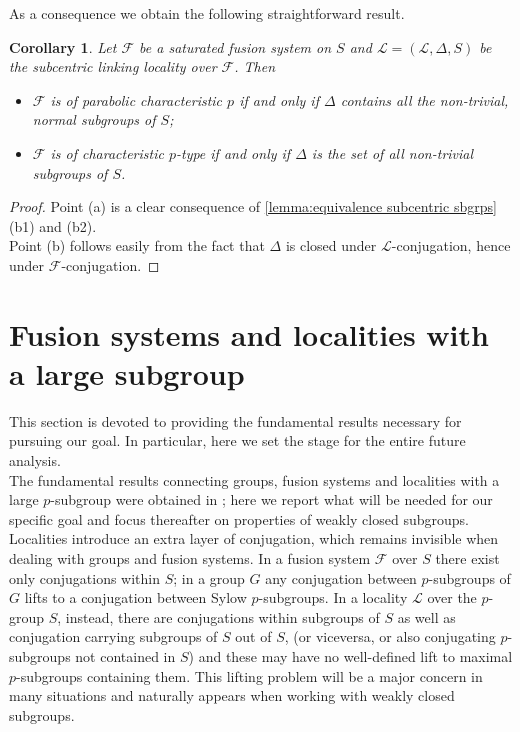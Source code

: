 \documentclass{amsart}
\numberwithin{equation}{section}
\newtheorem{cor}[equation]{Corollary}
\theoremstyle{definition}
\theoremstyle{subresult}
\theoremstyle{caseresult}
\newcommand{\F}{\mathcal{F}}
\renewcommand{\L}{\mathcal{L}}
\newcommand{\<}{\langle}
\renewcommand{\>}{\rangle}
\begin{document}
As a consequence we obtain the following straightforward result.

\begin{cor}
	\label{cor:locality transl of char p type}
    Let $\F$ be a saturated fusion system on $S$ and $\L=(\L,\Delta,S)$ be the subcentric linking locality over $\F$. Then
    \begin{itemize}
        \item[(a)] $\F$ is of parabolic characteristic $p$ if and only if $\Delta$ contains all the non-trivial, normal subgroups of $S$;
        \item[(b)] $\F$ is of characteristic $p$-type if and only if $\Delta$ is the set of all non-trivial subgroups of $S$.
    \end{itemize}
\end{cor}
\begin{proof}
    Point (a) is a clear consequence of \ref{lemma:equivalence subcentric sbgrps}(b1) and (b2).\\
    Point (b) follows easily from the fact that $\Delta$ is closed under $\L$-conjugation, hence under $\F$-conjugation.
\end{proof}



\section{Fusion systems and localities with a large subgroup}
\label{large subgroups}
This section is devoted to providing the fundamental results necessary for pursuing our goal. In particular, here we set the stage for the entire future analysis.\\
The fundamental results connecting groups, fusion systems and localities with a large $p$-subgroup were obtained in \cite[Section 4]{Henke-Salati:2026}; here we report what will be needed for our specific goal and focus thereafter on properties of weakly closed subgroups. Localities introduce an extra layer of conjugation, which remains invisible when dealing with groups and fusion systems. In a fusion system $\F$ over $S$ there exist only conjugations within $S$; in a group $G$ any conjugation between $p$-subgroups of $G$ lifts to a conjugation between Sylow $p$-subgroups. In a locality $\L$ over the $p$-group $S$, instead, there are conjugations within subgroups of $S$ as well as conjugation carrying subgroups of $S$ out of $S$, (or viceversa, or also conjugating $p$-subgroups not contained in $S$) and these may have no well-defined lift to maximal $p$-subgroups containing them. This lifting problem will be a major concern in many situations and naturally appears when working with weakly closed subgroups.\\
\end{document}
